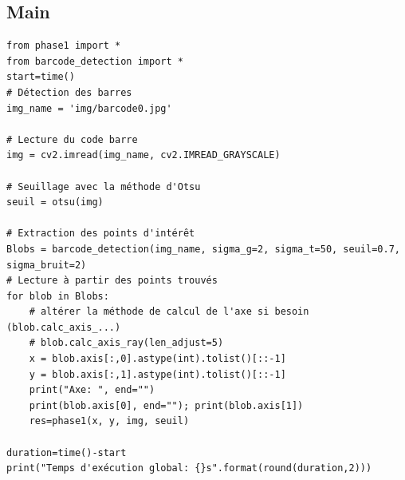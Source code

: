 \documentclass{rapport}
\begin{document}
\subsection{Main}
\begin{lstlisting}
from phase1 import *
from barcode_detection import *
start=time()
# Détection des barres
img_name = 'img/barcode0.jpg'

# Lecture du code barre 
img = cv2.imread(img_name, cv2.IMREAD_GRAYSCALE)

# Seuillage avec la méthode d'Otsu
seuil = otsu(img)

# Extraction des points d'intérêt
Blobs = barcode_detection(img_name, sigma_g=2, sigma_t=50, seuil=0.7, sigma_bruit=2)
# Lecture à partir des points trouvés
for blob in Blobs:
    # altérer la méthode de calcul de l'axe si besoin (blob.calc_axis_...)
    # blob.calc_axis_ray(len_adjust=5)
    x = blob.axis[:,0].astype(int).tolist()[::-1]
    y = blob.axis[:,1].astype(int).tolist()[::-1]
    print("Axe: ", end="")
    print(blob.axis[0], end=""); print(blob.axis[1])
    res=phase1(x, y, img, seuil)

duration=time()-start
print("Temps d'exécution global: {}s".format(round(duration,2)))
\end{lstlisting}
\end{document}

